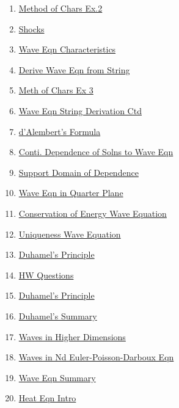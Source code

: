 \documentclass[11pt]{article}
\begin{document}
\begin{multicols}{2}
\begin{enumerate}
		\item  \href{https://mp.weixin.qq.com/s/4ncTI0zK8bx4lbvouoB-BA}{Method of Chars Ex.2} %
		\item  \href{https://mp.weixin.qq.com/s/yaMqkakujV_MlQC2SId50A}{Shocks} %
		\item  \href{https://mp.weixin.qq.com/s/pXK3dZYCcm1QFpIk1ybmKg}{Wave Eqn Characteristics} %
		\item  \href{https://mp.weixin.qq.com/s/2YxHd7dG5zyeDSIqnuZlHw}{Derive Wave Eqn from String} %
		\item  \href{https://mp.weixin.qq.com/s/hD_z87GSCc1YPXKzI70guA}{Meth of Chars Ex 3} %
		\item  \href{https://mp.weixin.qq.com/s/EBEI_rpdtJSm3xeBxfa_dw}{Wave Eqn String Derivation Ctd} %
		\item  \href{https://mp.weixin.qq.com/s/EbRvVOD1Kv4mHivZQPEdTQ}{d'Alembert's Formula} %
		\item  \href{https://mp.weixin.qq.com/s/15OP1vORyn8qwVrDeSjnAQ}{Conti. Dependence of Solns to Wave Eqn} %
		\item  \href{https://mp.weixin.qq.com/s/UG87eUQjrm6-nmp25ymHig}{Support Domain of Dependence} %
		\item  \href{https://mp.weixin.qq.com/s/DDWoWD-D-EWTtsC8n0tl2g}{Wave Eqn in Quarter Plane} %
		\item  \href{https://mp.weixin.qq.com/s/cB2di6mGSaOK6BhKhMWFNw}{Conservation of Energy  Wave Equation} %
		\item  \href{https://mp.weixin.qq.com/s/29AUMdjsAZtVffHkTcgUeQ}{Uniqueness  Wave Equation} %
		\item  \href{https://mp.weixin.qq.com/s/RAH3CskfuXB7ICxgzJ_I-g}{Duhamel's Principle} %
		\item  \href{https://mp.weixin.qq.com/s/lZ2KuejMW9ptRLocLH-MbQ}{HW Questions} %
		\item  \href{https://mp.weixin.qq.com/s/xIOV-52IoVjF4DNjVSuSVg}{Duhamel's Principle} %
		\item  \href{https://mp.weixin.qq.com/s/pfGVC6Vp1P6xk5hR_9-EaA}{Duhamel's Summary} %
		\item  \href{https://mp.weixin.qq.com/s/SV0uyl0huGjSrbCl5vdVJA}{Waves in Higher Dimensions} %
		\item  \href{https://mp.weixin.qq.com/s/RGhLJx9UrwKj7WJ3OsPp3Q}{Waves in Nd Euler-Poisson-Darboux Eqn} %
		\item  \href{https://mp.weixin.qq.com/s/N1stLQnhXFjGtMwKmRYlOg}{Wave Eqn Summary} %
		\item  \href{https://mp.weixin.qq.com/s/LWnyXOpzTFoncghzgpoYQg}{Heat Eqn Intro} %

\end{enumerate}
\end{multicols}
\end{document}
